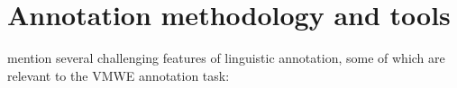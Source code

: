 \documentclass[output=paper,modfonts]{langscibook}
\begin{document}
\section{Annotation methodology and tools}
\label{sec:methodology}

%
\citet{DBLP:journals/coling/MathetWM15} mention several challenging features of linguistic annotation, some of which are relevant to the VMWE annotation task:
\end{document}
